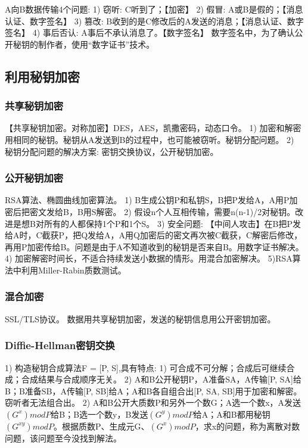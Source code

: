 \documentclass[UTF8]{../computerUniverse}
\begin{document}
A向B数据传输4个问题: 
1) 窃听: C听到了；【加密】
2) 假冒: A或B是假的；【消息认证、数字签名】
3) 篡改: B收到的是C修改后的A发送的消息；【消息认证、数字签名】
4) 事后否认: A事后不承认消息了。【数字签名】
数字签名中，为了确认公开秘钥的制作者，使用“数字证书”技术。



\subsection{利用秘钥加密}

\subsubsection{共享秘钥加密}
【共享秘钥加密。对称加密】DES，AES，凯撒密码，动态口令。
1) 加密和解密用相同的秘钥。秘钥从A发送到B的过程中，也可能被窃听。秘钥分配问题。
2) 秘钥分配问题的解决方案: 密钥交换协议，公开秘钥加密。


\subsubsection{公开秘钥加密}
RSA算法、椭圆曲线加密算法。
1) B生成公钥P和私钥S，B把P发给A，A用P加密后把密文发给B，B用S解密。
2) 假设n个人互相传输，需要n(n-1)/2对秘钥。改进是想B对所有的人都保持1个P和1个S。
3) 安全问题: 【中间人攻击】在B把P发给A时，C截获P，把Q发给A，A用Q加密后的密文再次被C截获，C解密后修改，再用P加密传给B。问题是由于A不知道收到的秘钥是否来自B。用数字证书解决。
4) 加密解密时间长，不适合持续发送小数据的情形。用混合加密解决。
5)RSA算法中利用Miller-Rabin质数测试。


\subsubsection{混合加密}
SSL/TLS协议。
数据用共享秘钥加密，发送的秘钥信息用公开密钥加密。


\subsubsection{Diffie-Hellman密钥交换}
1) 构造秘钥合成算法F = [P, S],具有特点: 1) 可合成不可分解；合成后可继续合成；合成结果与合成顺序无关。
2) A和B公开秘钥P，A准备SA，A传输[P, SA]给B；B准备SB，A传输[P, SB]给A；A和B各自组合出[P, SA, SB]用于加密和解密。窃听者无法组合出。
2) A和B公开大质数P和另外一个数G；A选一个数x，A发送$(G^x)modP$给B；B选一个数y，B发送$(G^y)modP$给A；A和B都用秘钥$(G^{xy})modP$。根据质数P、生成元G、$(G^x)modP$，求x的问题，称为离散对数问题，该问题至今没找到解法。
\end{document}
